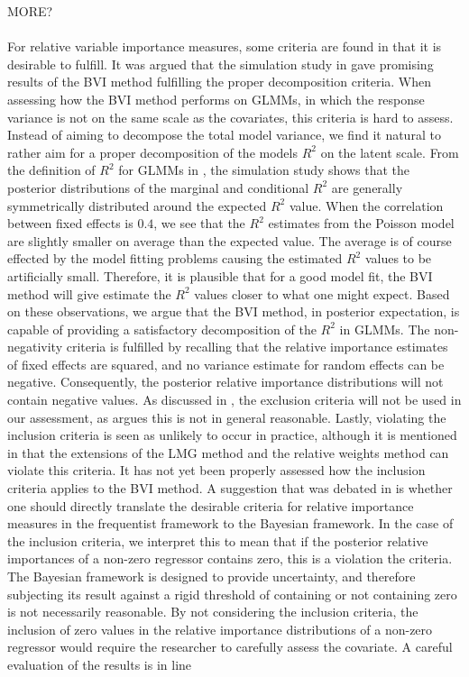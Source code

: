 MORE?
\\
\\
For relative variable importance measures, some criteria are found in  that it is desirable to fulfill. It was argued that the simulation study in \citet{Arnstad:Relative_variable_importance_in_Bayesian_linear_mixed_models:2024} gave promising results of the BVI method fulfilling the proper decomposition criteria. When assessing how the BVI method performs on GLMMs, in which the response variance is not on the same scale as the covariates, this criteria is hard to assess. Instead of aiming to decompose the total model variance, we find it natural to rather aim for a proper decomposition of the models $R^2$ on the latent scale. From the definition of $R^2$ for GLMMs in \citet{nakagawa2013general}, the simulation study shows that the posterior distributions of the marginal and conditional $R^2$ are generally symmetrically distributed around the expected $R^2$ value. When the correlation between fixed effects is $0.4$, we see that the $R^2$ estimates from the Poisson model are slightly smaller on average than the expected value. The average is of course effected by the model fitting problems causing the estimated $R^2$ values to be artificially small. Therefore, it is plausible that for a good model fit, the BVI method will give estimate the $R^2$ values closer to what one might expect. Based on these observations, we argue that the BVI method, in posterior expectation, is capable of providing a satisfactory decomposition of the $R^2$ in GLMMs. The non-negativity criteria is fulfilled by recalling that the relative importance estimates of fixed effects are squared, and no variance estimate for random effects can be negative. Consequently, the posterior relative importance distributions will not contain negative values. As discussed in \citet{Arnstad:Relative_variable_importance_in_Bayesian_linear_mixed_models:2024}, the exclusion criteria will not be used in our assessment, as \citet{gromping_relaimpo} argues this is not in general reasonable. Lastly, violating  the inclusion criteria is seen as unlikely to occur in practice, although it is mentioned in \citet{matre} that the extensions of the LMG method and the relative weights method can violate this criteria. It has not yet been properly assessed how the inclusion criteria applies to the BVI method. A suggestion that was debated in \citep{Arnstad:Relative_variable_importance_in_Bayesian_linear_mixed_models:2024} is whether one should directly translate the desirable criteria for relative importance measures in the frequentist framework to the Bayesian framework. In the case of the inclusion criteria, we interpret this to mean that if the posterior relative importances of a non-zero regressor contains zero, this is a violation the criteria. The Bayesian framework is designed to provide uncertainty, and therefore subjecting its result against a rigid threshold of containing or not containing zero is not necessarily reasonable. By not considering the inclusion criteria, the inclusion of zero values in the relative importance distributions of a non-zero regressor would require the researcher to carefully assess the covariate. A careful evaluation of the results is in line 